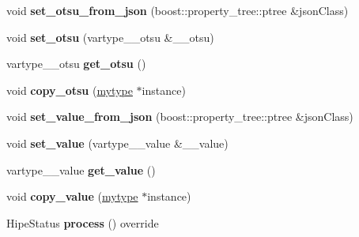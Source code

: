 \begin{DoxyCompactItemize}
\item 
\mbox{\label{classfilter_1_1algos_1_1_binary_a0ceee36e1daeb1356c11f9b27c31e434}} 
void {\bfseries set\+\_\+otsu\+\_\+from\+\_\+json} (boost\+::property\+\_\+tree\+::ptree \&json\+Class)
\item 
\mbox{\label{classfilter_1_1algos_1_1_binary_a1b371538af9d35703196032adb2aa4b4}} 
void {\bfseries set\+\_\+otsu} (vartype\+\_\+\+\_\+otsu \&\+\_\+\+\_\+otsu)
\item 
\mbox{\label{classfilter_1_1algos_1_1_binary_a39e4676c1948348bc560c6ba35276171}} 
vartype\+\_\+\+\_\+otsu {\bfseries get\+\_\+otsu} ()
\item 
\mbox{\label{classfilter_1_1algos_1_1_binary_a549489d7fe1afb90c362129aaa43f9f7}} 
void {\bfseries copy\+\_\+otsu} (\hyperlink{classfilter_1_1algos_1_1_binary}{mytype} $\ast$instance)
\item 
\mbox{\label{classfilter_1_1algos_1_1_binary_a7548655001993c4e0aaab554e7cb178b}} 
void {\bfseries set\+\_\+value\+\_\+from\+\_\+json} (boost\+::property\+\_\+tree\+::ptree \&json\+Class)
\item 
\mbox{\label{classfilter_1_1algos_1_1_binary_afe2d4ce88c57f432e780e9e7b3661fd4}} 
void {\bfseries set\+\_\+value} (vartype\+\_\+\+\_\+value \&\+\_\+\+\_\+value)
\item 
\mbox{\label{classfilter_1_1algos_1_1_binary_a1fe90e52279a6de77c7518e14bd568b6}} 
vartype\+\_\+\+\_\+value {\bfseries get\+\_\+value} ()
\item 
\mbox{\label{classfilter_1_1algos_1_1_binary_aa672c977a7a5e562dbd93b7a7f3aa64d}} 
void {\bfseries copy\+\_\+value} (\hyperlink{classfilter_1_1algos_1_1_binary}{mytype} $\ast$instance)
\item 
\mbox{\label{classfilter_1_1algos_1_1_binary_a807c847c452e4c1da794afb96d8b78cd}} 
Hipe\+Status {\bfseries process} () override
\end{DoxyCompactItemize}
